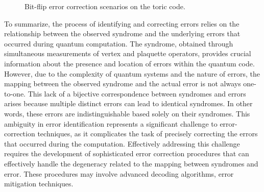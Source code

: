 \documentclass{Configuration_Files/PoliMi3i_thesis}
\begin{document}
\begin{figure}
\begin{center}
	\end{center}
	
	\caption{Bit-flip error correction scenarios on the toric code. }
	\label{fig:errorscorr}
\end{figure}

To summarize, the process of identifying and correcting errors relies on the relationship between the observed syndrome and the underlying errors that occurred during quantum computation. 
The syndrome, obtained through simultaneous measurements of vertex and plaquette operators, provides crucial information about the presence and location of errors within the quantum code. However, due to the complexity of quantum systems and the nature of errors, the mapping between the observed syndrome and the actual error is not always one-to-one. 
This lack of a bijective correspondence between syndromes and errors arises because multiple distinct errors can lead to identical syndromes. In other words, these errors are indistinguishable based solely on their syndromes. 
This ambiguity in error identification represents a significant challenge to error-correction techniques, as it complicates the task of precisely correcting the errors that occurred during the computation. Effectively addressing this challenge requires the development of sophisticated error correction procedures that can effectively handle the degeneracy related to the mapping between syndromes and error. These procedures may involve advanced decoding algorithms, error mitigation techniques. \newline
\end{document}

